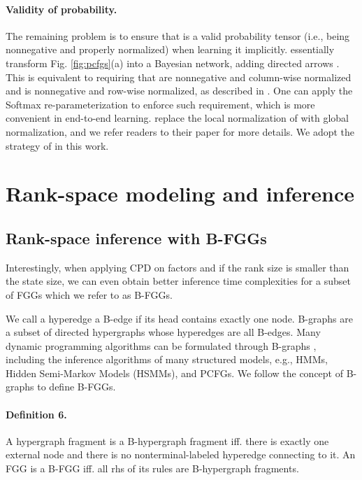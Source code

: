 \documentclass[11pt]{article}
\begin{document}
\paragraph{Validity of probability.}  The remaining problem is to ensure that  is a valid probability tensor (i.e., being nonnegative and properly normalized) when learning it implicitly.  \citet{yang-etal-2021-pcfgs} essentially transform Fig. \ref{fig:pcfgs}(a) into a Bayesian network, adding directed arrows . This is equivalent to requiring that  are nonnegative and column-wise normalized and  is nonnegative and row-wise normalized, as described in \citet[][]{yang-etal-2021-pcfgs}. One can apply the Softmax re-parameterization to enforce such requirement, which is more convenient in end-to-end learning. \citet{chiu2021low} replace the local normalization of \citet{yang-etal-2021-pcfgs} with global normalization, and we refer readers to their paper for more details. We adopt the strategy of \citet{yang-etal-2021-pcfgs} in this work.






\section{Rank-space modeling and inference}
\subsection{Rank-space inference with B-FGGs}
Interestingly, when applying CPD on factors and if the rank size is smaller than the state size, we can even obtain better inference time complexities for a subset of FGGs which we refer to as B-FGGs. 

We call a hyperedge a B-edge if its head contains exactly one node.
B-graphs \cite{DBLP:journals/dam/GalloLP93} are a subset of directed hypergraphs whose hyperedges are all B-edges. Many dynamic programming algorithms can be formulated through B-graphs \cite{DBLP:conf/iwpt/KleinM01,huang-2008-advanced, DBLP:journals/corr/AzumaSM17, chiu2021low,  fu2021scaling}, including the inference algorithms of many structured models, e.g., HMMs, Hidden Semi-Markov Models (HSMMs), and PCFGs. We follow the concept of B-graphs to define B-FGGs.

\paragraph{Definition 6.} A hypergraph fragment is a B-hypergraph fragment iff. there is exactly one external node and there is no nonterminal-labeled hyperedge connecting to it. An FGG is a B-FGG iff. all rhs of its rules are B-hypergraph fragments.
\end{document}
